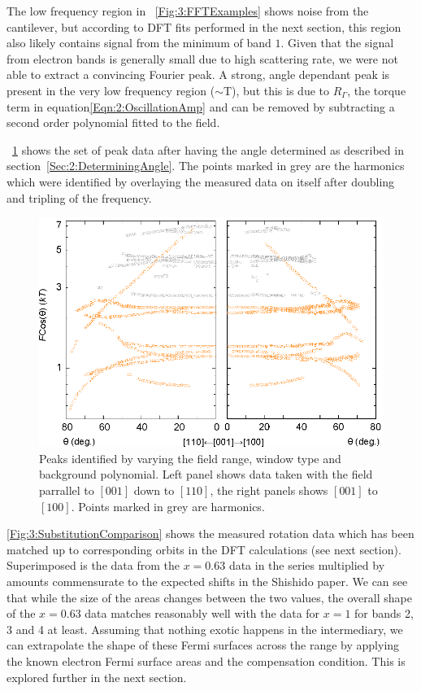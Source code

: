 {{{The low frequency region in \fig~\ref{Fig:3:FFTExamples} shows noise from the cantilever, but according to DFT fits performed in the next section, this region also likely contains signal from the minimum of band $1$. Given that the signal from electron bands is generally small due to high scattering rate, we were not able to extract a convincing Fourier peak. A strong, angle dependant peak is present in the very low frequency region ($\sim$\unit[10]{T}), but this is due to $R_{\Gamma}$, the torque term in equation\ref{Eqn:2:OscillationAmp} and can be removed by subtracting a second order polynomial fitted to the field.

\Fig~\ref{Fig:3:AngleSweepMeasured} shows the set of peak data after having the angle determined as described in section~\ref{Sec:2:DeterminingAngle}. The points marked in grey are the harmonics which were identified by overlaying the measured data on itself after doubling and tripling of the frequency.
\begin{figure}[h!]
    \begin{center}
        \includegraphics[scale=0.9]{Chapter3-dHvABaFe2P2/Figures/AngleDepMeasurements/AngleSweepMeasured/AngleSweepMeasured}
        \caption{Peaks identified by varying the field range, window type and background polynomial. Left panel shows data taken with the field parrallel to $[001]$ down to $[110]$, the right panels shows $[001]$ to $[100]$. Points marked in grey are harmonics.}
        \label{Fig:3:AngleSweepMeasured}
    \end{center}
\end{figure}
\Fig\ref{Fig:3:SubstitutionComparison} shows the measured rotation data which has been matched up to corresponding orbits in the DFT calculations (see next section). Superimposed is the data from the $x=0.63$ data in the \BaFePAs series multiplied by amounts commensurate to the expected shifts in the Shishido paper\cite{Shishido2010}. We can see that while the size of the areas changes between the two values, the overall shape of the $x=0.63$ data matches reasonably well with the data for $x=1$ for bands 2, 3 and 4 at least. Assuming that nothing exotic happens in the intermediary, we can extrapolate the shape of these Fermi surfaces across the range by applying the known electron Fermi surface areas and the compensation condition. This is explored further in the next section.
}}}
